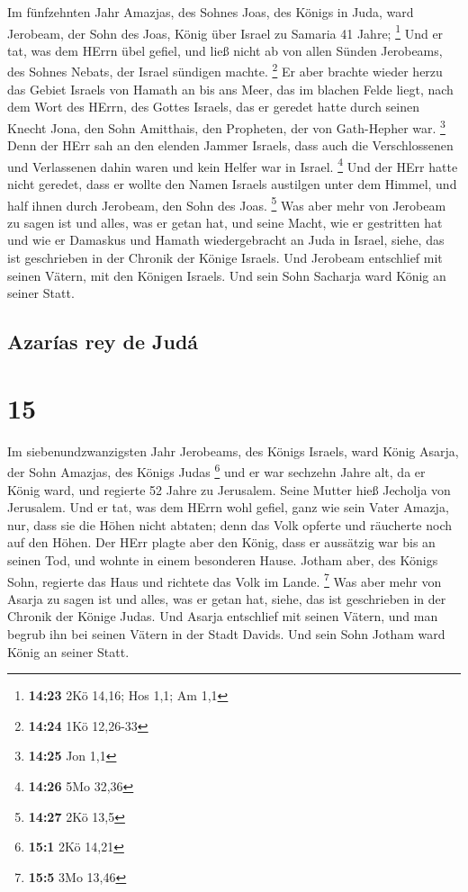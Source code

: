  Im fünfzehnten Jahr Amazjas, des Sohnes Joas, des Königs
in Juda, ward Jerobeam, der Sohn des Joas, König über Israel zu Samaria
41 Jahre; \footnote{\textbf{14:23} 2Kö 14,16; Hos 1,1; Am 1,1}
 Und er tat, was dem HErrn übel gefiel, und ließ nicht ab
von allen Sünden Jerobeams, des Sohnes Nebats, der Israel sündigen
machte. \footnote{\textbf{14:24} 1Kö 12,26-33}  Er aber
brachte wieder herzu das Gebiet Israels von Hamath an bis ans Meer, das
im blachen Felde liegt, nach dem Wort des HErrn, des Gottes Israels, das
er geredet hatte durch seinen Knecht Jona, den Sohn Amitthais, den
Propheten, der von Gath-Hepher war. \footnote{\textbf{14:25} Jon 1,1}
 Denn der HErr sah an den elenden Jammer Israels, dass
auch die Verschlossenen und Verlassenen dahin waren und kein Helfer war
in Israel. \footnote{\textbf{14:26} 5Mo 32,36}  Und der
HErr hatte nicht geredet, dass er wollte den Namen Israels austilgen
unter dem Himmel, und half ihnen durch Jerobeam, den Sohn des Joas.
\footnote{\textbf{14:27} 2Kö 13,5}  Was aber mehr von
Jerobeam zu sagen ist und alles, was er getan hat, und seine Macht, wie
er gestritten hat und wie er Damaskus und Hamath wiedergebracht an Juda
in Israel, siehe, das ist geschrieben in der Chronik der Könige Israels.
 Und Jerobeam entschlief mit seinen Vätern, mit den
Königen Israels. Und sein Sohn Sacharja ward König an seiner Statt.

\hypertarget{azaruxedas-rey-de-juduxe1}{%
\subsection{Azarías rey de Judá}\label{azaruxedas-rey-de-juduxe1}}

\hypertarget{section-14}{%
\section{15}\label{section-14}}

 Im siebenundzwanzigsten Jahr Jerobeams, des Königs
Israels, ward König Asarja, der Sohn Amazjas, des Königs Judas
\footnote{\textbf{15:1} 2Kö 14,21}  und er war sechzehn
Jahre alt, da er König ward, und regierte 52 Jahre zu Jerusalem. Seine
Mutter hieß Jecholja von Jerusalem.  Und er tat, was dem
HErrn wohl gefiel, ganz wie sein Vater Amazja,  nur, dass
sie die Höhen nicht abtaten; denn das Volk opferte und räucherte noch
auf den Höhen.  Der HErr plagte aber den König, dass er
aussätzig war bis an seinen Tod, und wohnte in einem besonderen Hause.
Jotham aber, des Königs Sohn, regierte das Haus und richtete das Volk im
Lande. \footnote{\textbf{15:5} 3Mo 13,46}  Was aber mehr
von Asarja zu sagen ist und alles, was er getan hat, siehe, das ist
geschrieben in der Chronik der Könige Judas.  Und Asarja
entschlief mit seinen Vätern, und man begrub ihn bei seinen Vätern in
der Stadt Davids. Und sein Sohn Jotham ward König an seiner Statt.

